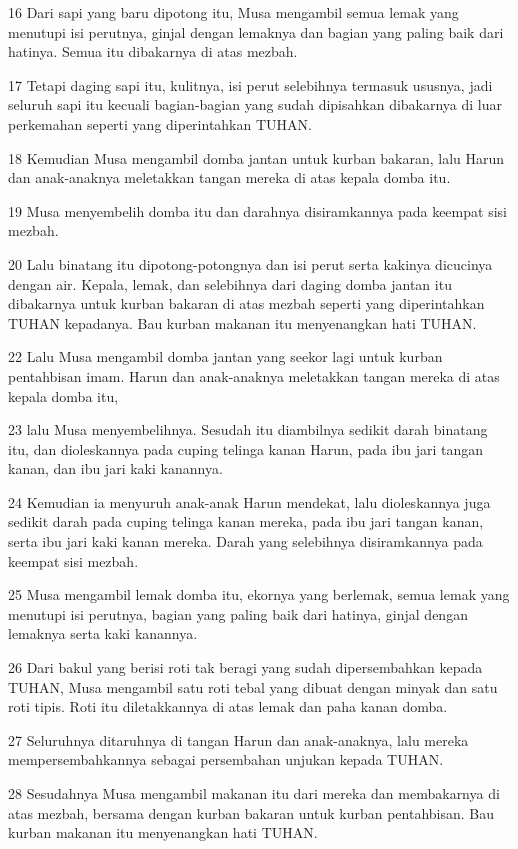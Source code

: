 \par 16 Dari sapi yang baru dipotong itu, Musa mengambil semua lemak yang menutupi isi perutnya, ginjal dengan lemaknya dan bagian yang paling baik dari hatinya. Semua itu dibakarnya di atas mezbah.
\par 17 Tetapi daging sapi itu, kulitnya, isi perut selebihnya termasuk ususnya, jadi seluruh sapi itu kecuali bagian-bagian yang sudah dipisahkan dibakarnya di luar perkemahan seperti yang diperintahkan TUHAN.
\par 18 Kemudian Musa mengambil domba jantan untuk kurban bakaran, lalu Harun dan anak-anaknya meletakkan tangan mereka di atas kepala domba itu.
\par 19 Musa menyembelih domba itu dan darahnya disiramkannya pada keempat sisi mezbah.
\par 20 Lalu binatang itu dipotong-potongnya dan isi perut serta kakinya dicucinya dengan air. Kepala, lemak, dan selebihnya dari daging domba jantan itu dibakarnya untuk kurban bakaran di atas mezbah seperti yang diperintahkan TUHAN kepadanya. Bau kurban makanan itu menyenangkan hati TUHAN.
\par 22 Lalu Musa mengambil domba jantan yang seekor lagi untuk kurban pentahbisan imam. Harun dan anak-anaknya meletakkan tangan mereka di atas kepala domba itu,
\par 23 lalu Musa menyembelihnya. Sesudah itu diambilnya sedikit darah binatang itu, dan dioleskannya pada cuping telinga kanan Harun, pada ibu jari tangan kanan, dan ibu jari kaki kanannya.
\par 24 Kemudian ia menyuruh anak-anak Harun mendekat, lalu dioleskannya juga sedikit darah pada cuping telinga kanan mereka, pada ibu jari tangan kanan, serta ibu jari kaki kanan mereka. Darah yang selebihnya disiramkannya pada keempat sisi mezbah.
\par 25 Musa mengambil lemak domba itu, ekornya yang berlemak, semua lemak yang menutupi isi perutnya, bagian yang paling baik dari hatinya, ginjal dengan lemaknya serta kaki kanannya.
\par 26 Dari bakul yang berisi roti tak beragi yang sudah dipersembahkan kepada TUHAN, Musa mengambil satu roti tebal yang dibuat dengan minyak dan satu roti tipis. Roti itu diletakkannya di atas lemak dan paha kanan domba.
\par 27 Seluruhnya ditaruhnya di tangan Harun dan anak-anaknya, lalu mereka mempersembahkannya sebagai persembahan unjukan kepada TUHAN.
\par 28 Sesudahnya Musa mengambil makanan itu dari mereka dan membakarnya di atas mezbah, bersama dengan kurban bakaran untuk kurban pentahbisan. Bau kurban makanan itu menyenangkan hati TUHAN.

